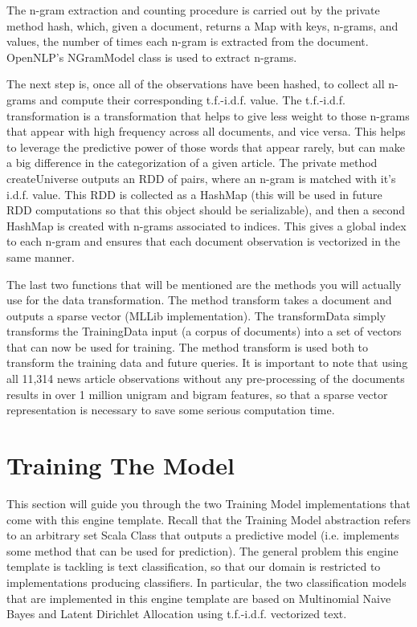 \documentclass[a4paper,12pt]{article}
\newcommand{\3}{\left}
\newcommand{\4}{\right}
\renewcommand{\-}[1]{{}^{-#1}}
\begin{document}
The n-gram extraction and counting procedure is carried out by the private method hash, which, given a document, returns a Map with keys, n-grams, and values, the number of times each n-gram is extracted from the document. OpenNLP's NGramModel class is used to extract n-grams.

The next step is, once all of the observations have been hashed, to collect all n-grams and compute their corresponding t.f.-i.d.f. 
value. The t.f.-i.d.f. transformation is a transformation that helps to give less weight to those n-grams that appear with high frequency across all documents, and vice versa. This helps to leverage the predictive power of those words that appear rarely, but can make a big difference in the categorization of a given article. The private method createUniverse outputs an RDD of pairs, where an n-gram is matched with it's i.d.f. value. This RDD is collected as a HashMap (this will be used in future RDD computations so that this object should be serializable), and then a second HashMap is created with n-grams associated to indices. This gives a global index to each n-gram and ensures that each document observation is vectorized in the same manner. 

The last two functions that will be mentioned are the methods you will actually use for the data transformation. The method transform takes a document and outputs a sparse vector (MLLib implementation). The transformData simply transforms the TrainingData input (a corpus of documents) into a set of vectors that can now be used for training. The method transform is used both to transform the training data and future queries. It is important to note that using all 11,314 news article observations without any pre-processing of the documents results in over 1 million unigram and bigram features, so that a sparse vector representation is necessary to save some serious computation time.

\section*{Training The Model}

This section will guide you through the two Training Model implementations that come with this engine template. Recall that the Training Model abstraction refers to an arbitrary set Scala Class that outputs a predictive model (i.e. implements some method that can be used for prediction). The general problem this engine template is tackling is text classification, so that our domain is restricted to implementations producing classifiers. In particular, the two classification models that are implemented in this engine template are based on Multinomial Naive Bayes and Latent Dirichlet Allocation using t.f.-i.d.f. vectorized text. 
\end{document}
